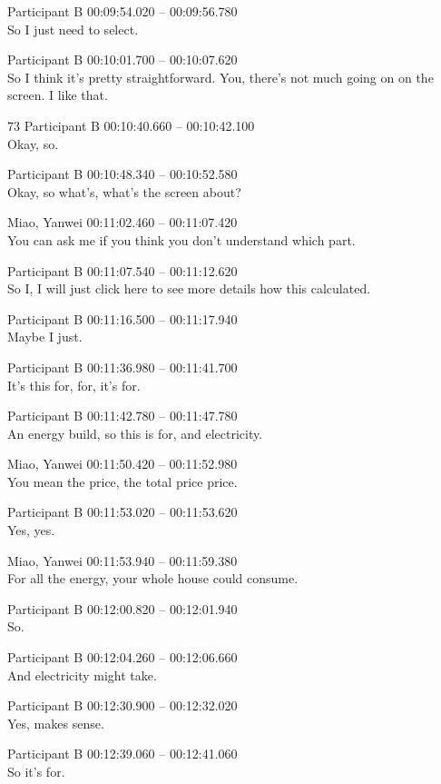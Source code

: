 {Participant B 00:09:54.020 -- 00:09:56.780 \\
So I just need to select.

Participant B 00:10:01.700 -- 00:10:07.620 \\
So I think it's pretty straightforward. You, there's not much going on on the screen. I like that.

73
Participant B 00:10:40.660 -- 00:10:42.100 \\
Okay, so.

Participant B 00:10:48.340 -- 00:10:52.580 \\
Okay, so what's, what's the screen about?

Miao, Yanwei 00:11:02.460 -- 00:11:07.420 \\
You can ask me if you think you don't understand which part.

Participant B 00:11:07.540 -- 00:11:12.620 \\
So I, I will just click here to see more details how this calculated.

Participant B 00:11:16.500 -- 00:11:17.940 \\
Maybe I just.

Participant B 00:11:36.980 -- 00:11:41.700 \\
It's this for, for, it's for.

Participant B 00:11:42.780 -- 00:11:47.780 \\
An energy build, so this is for, and electricity.

Miao, Yanwei 00:11:50.420 -- 00:11:52.980 \\
You mean the price, the total price price.

Participant B 00:11:53.020 -- 00:11:53.620 \\
Yes, yes.

Miao, Yanwei 00:11:53.940 -- 00:11:59.380 \\
For all the energy, your whole house could consume.

Participant B 00:12:00.820 -- 00:12:01.940 \\
So.

Participant B 00:12:04.260 -- 00:12:06.660 \\
And electricity might take.

Participant B 00:12:30.900 -- 00:12:32.020 \\
Yes, makes sense.

Participant B 00:12:39.060 -- 00:12:41.060 \\
So it's for.

}
